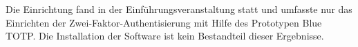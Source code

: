 Die Einrichtung fand in der Einführungsveranstaltung statt und umfasste nur das
Einrichten der Zwei-Faktor-Authentisierung mit Hilfe des Prototypen \glqq Blue 
TOTP\grqq{}. Die Installation der Software ist kein Bestandteil dieser Ergebnisse.
